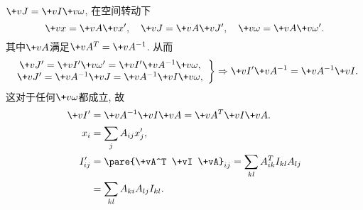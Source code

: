 \documentclass[../LectureNotes.tex]{subfiles}
\begin{document}
$\+vJ = \+vI\+v\omega$, 在空间转动下
\[ \+vx = \+vA \+vx',\quad \+vJ = \+vA\+vJ',\quad \+v\omega = \+vA\+v\omega'. \]
其中$\+vA$满足$\+vA^T = \+vA^{-1}$. 从而
\[ \left. \begin{array}{c}
    \+vJ' = \+vI'\+v\omega' = \+vI'\+vA^{-1}\+v\omega, \\
    \+vJ' = \+vA^{-1}\+vJ = \+vA^{-1}\+vI\+v\omega,
\end{array} \right\} \Rightarrow \+vI'\+vA^{-1} = \+vA^{-1}\+vI. \]
这对于任何$\+v\omega$都成立, 故
\begin{align*}
    \+vI' &= \+vA^{-1} \+vI \+vA = \+vA^T \+vI \+vA. \\
    x_i &= \sum_j A_{ij}x'_j, \\
    I'_{ij} &= \pare{\+vA^T \+vI \+vA}_{ij} = \sum_{kl}A^T_{ik} I_{kl} A_{lj} \\
    &= \sum_{kl} A_{ki}A_{lj}I_{kl}.
\end{align*}

\end{document}
